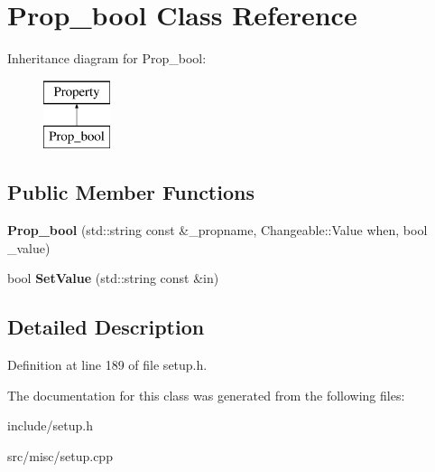 \hypertarget{classProp__bool}{\section{Prop\-\_\-bool Class Reference}
\label{classProp__bool}
}
Inheritance diagram for Prop\-\_\-bool\-:\begin{figure}[H]
\begin{center}
\leavevmode
\includegraphics[height=2.000000cm]{classProp__bool}
\end{center}
\end{figure}
\subsection*{Public Member Functions}
\begin{DoxyCompactItemize}
\item 
\hypertarget{classProp__bool_ab70b5efc7550776962b20ecc1fd329ca}{{\bfseries Prop\-\_\-bool} (std\-::string const \&\-\_\-propname, Changeable\-::\-Value when, bool \-\_\-value)}\label{classProp__bool_ab70b5efc7550776962b20ecc1fd329ca}

\item 
\hypertarget{classProp__bool_aed3bf08dc9a6f2973d7e24cc6407796a}{bool {\bfseries Set\-Value} (std\-::string const \&in)}\label{classProp__bool_aed3bf08dc9a6f2973d7e24cc6407796a}

\end{DoxyCompactItemize}


\subsection{Detailed Description}


Definition at line 189 of file setup.\-h.



The documentation for this class was generated from the following files\-:\begin{DoxyCompactItemize}
\item 
include/setup.\-h\item 
src/misc/setup.\-cpp\end{DoxyCompactItemize}
